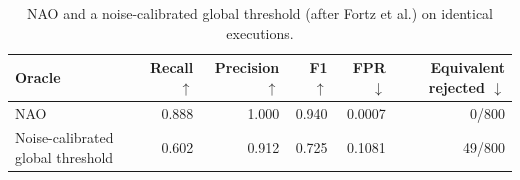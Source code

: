 \begin{table}[t]
\centering
\caption{NAO and a noise-calibrated global threshold (after Fortz et al.) on identical executions.}
\label{tab:rq4-global}
\small
\begin{tabular}{lrrrrr}
\toprule
Oracle & Recall $\uparrow$ & Precision $\uparrow$ & F1 $\uparrow$ & FPR $\downarrow$ & Equivalent rejected $\downarrow$ \\
\midrule
NAO & 0.888 & 1.000 & 0.940 & 0.0007 & 0/800 \\
Noise-calibrated global threshold & 0.602 & 0.912 & 0.725 & 0.1081 & 49/800 \\
\bottomrule
\end{tabular}
\end{table}

